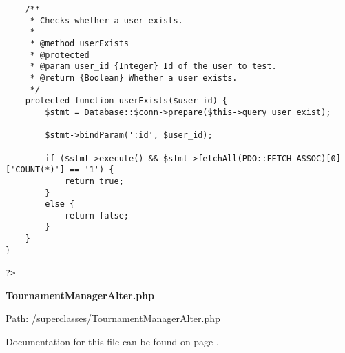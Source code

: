 {\begin{lstlisting}
	/**
	 * Checks whether a user exists.
	 *
	 * @method userExists
	 * @protected
	 * @param user_id {Integer} Id of the user to test.
	 * @return {Boolean} Whether a user exists.
	 */
	protected function userExists($user_id) {
		$stmt = Database::$conn->prepare($this->query_user_exist);

		$stmt->bindParam(':id', $user_id);

		if ($stmt->execute() && $stmt->fetchAll(PDO::FETCH_ASSOC)[0]['COUNT(*)'] == '1') {
			return true;
		}
		else {
			return false;
		}
	}
}

?>\end{lstlisting}
}
\textbf{TournamentManagerAlter.php}\label{TournamentManagerAlter.php}

Path: /superclasses/TournamentManagerAlter.php

Documentation for this file can be found on page \pageref{TournamentManagerAlter.php.doc}.

